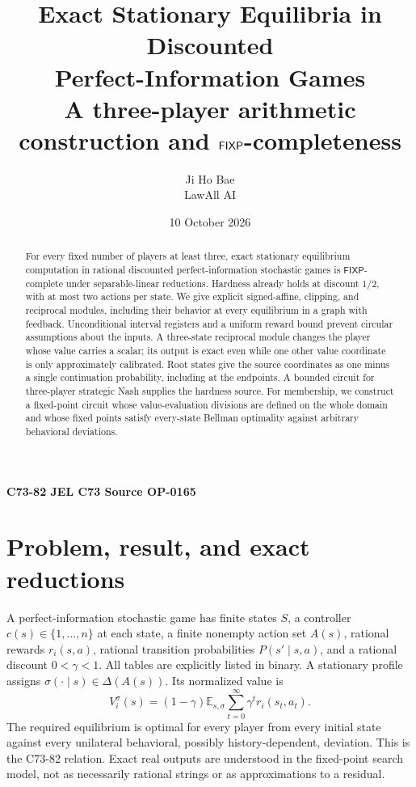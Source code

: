 \documentclass[11pt,a4paper]{article}
\title{Exact Stationary Equilibria in Discounted\\
Perfect-Information Games\\[4pt]
\large A three-player arithmetic construction and \(\FIXP\)-completeness}
\author{Ji Ho Bae\\\small LawAll AI}
\date{10 October 2026}
\numberwithin{equation}{section}
\theoremstyle{definition}
\newcommand{\E}{\mathbb E}
\newcommand{\FIXP}{\mathsf{FIXP}}
\begin{document}
\maketitle
\begin{center}
\small\textbf{C73-82 \quad JEL C73 \quad Source OP-0165}
\end{center}
\begin{abstract}
For every fixed number of players at least three, exact stationary
equilibrium computation in rational discounted perfect-information
stochastic games is \(\FIXP\)-complete under separable-linear reductions.
Hardness already holds at discount \(1/2\), with at most two actions per
state. We give explicit signed-affine, clipping, and reciprocal modules,
including their behavior at every equilibrium in a graph with feedback.
Unconditional interval registers and a uniform reward bound prevent
circular assumptions about the inputs. A three-state reciprocal module
changes the player whose value carries a scalar; its output is exact even
while one other value coordinate is only approximately calibrated.
Root states give the source coordinates as one minus a single continuation
probability, including at the endpoints. A bounded circuit for three-player
strategic Nash supplies the hardness source. For membership, we construct
a fixed-point circuit whose value-evaluation divisions are defined on the
whole domain and whose fixed points satisfy every-state Bellman
optimality against arbitrary behavioral deviations.
\end{abstract}

\section{Problem, result, and exact reductions}\label{sec:problem}

A perfect-information stochastic game has finite states \(S\), a controller
\(c(s)\in\{1,\ldots,n\}\) at each state, a finite nonempty action set
\(A(s)\), rational rewards \(r_i(s,a)\), rational transition probabilities
\(P(s'\mid s,a)\), and a rational discount \(0<\gamma<1\).
All tables are explicitly listed in binary. A stationary profile assigns
\(\sigma(\cdot\mid s)\in\Delta(A(s))\). Its normalized value is
\begin{equation}\label{eq:value}
 V_i^\sigma(s)=(1-\gamma)\E_{s,\sigma}
       \sum_{t=0}^{\infty}\gamma^t r_i(s_t,a_t).
\end{equation}
The required equilibrium is optimal for every player from every initial
state against every unilateral behavioral, possibly history-dependent,
deviation. This is the C73-82 relation. Exact real outputs are
understood in the fixed-point search model, not as necessarily rational
strings or as approximations to a residual.
\end{document}
